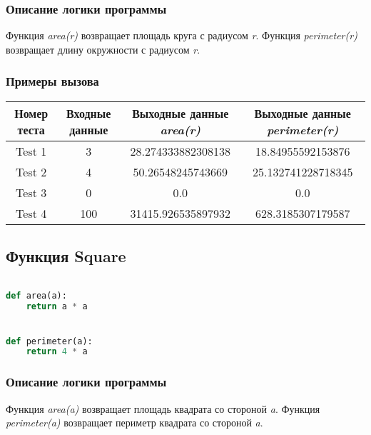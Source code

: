 \documentclass[14pt, a4paper]{article}
\begin{document}
\subsubsection*{\textbf{Описание логики программы}}

Функция \textit{area(r)} возвращает площадь круга с радиусом \textit{r}. 
Функция \textit{perimeter(r)} возвращает длину окружности с радиусом \textit{r}.

\subsubsection*{\textbf{Примеры вызова}}

\begin{center}
    \begin{tabular}{| c | c | c | c |}
        \hline
        Номер теста & Входные данные & Выходные данные \textit{area(r)} & Выходные данные \textit{perimeter(r)}\\
        \hline
        Test 1 & 3 & 28.274333882308138 & 18.84955592153876 \\
        \hline
        Test 2 & 4 & 50.26548245743669 & 25.132741228718345 \\
        \hline
        Test 3 & 0 & 0.0 & 0.0 \\
        \hline
        Test 4 & 100 & 31415.926535897932 & 628.3185307179587 \\
        \hline
    \end{tabular}
\end{center}

\subsection{Функция Square}

\begin{lstlisting}[language=Python]

def area(a):
    return a * a


def perimeter(a):
    return 4 * a


\end{lstlisting}

\subsubsection*{\textbf{Описание логики программы}}

Функция \textit{area(a)} возвращает площадь квадрата со стороной \textit{a}. Функция 
\textit{perimeter(a)} возвращает периметр квадрата со стороной \textit{a}.
\end{document}
